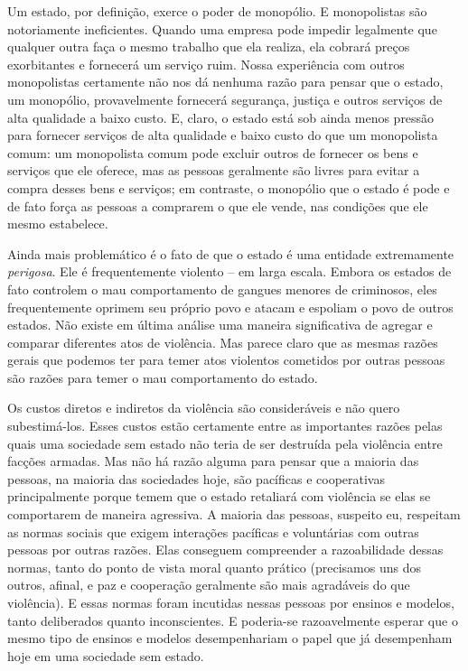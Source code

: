 Um estado, por definição, exerce o poder de monopólio. E monopolistas são notoriamente ineficientes. Quando uma empresa pode impedir legalmente que qualquer outra faça o mesmo trabalho que ela realiza, ela cobrará preços exorbitantes e fornecerá um serviço ruim. Nossa experiência com outros monopolistas certamente não nos dá nenhuma razão para pensar que o estado, um monopólio, provavelmente fornecerá segurança, justiça e outros serviços de alta qualidade a baixo custo. E, claro, o estado está sob ainda menos pressão para fornecer serviços de alta qualidade e baixo custo do que um monopolista comum: um monopolista comum pode excluir outros de fornecer os bens e serviços que ele oferece, mas as pessoas geralmente são livres para evitar a compra desses bens e serviços; em contraste, o monopólio que o estado é pode e de fato força as pessoas a comprarem o que ele vende, nas condições que ele mesmo estabelece.

Ainda mais problemático é o fato de que o estado é uma entidade extremamente \emph{perigosa}. Ele é frequentemente violento -- em larga escala. Embora os estados de fato controlem o mau comportamento de gangues menores de criminosos, eles frequentemente oprimem seu próprio povo e atacam e espoliam o povo de outros estados. Não existe em última análise uma maneira significativa de agregar e comparar diferentes atos de violência. Mas parece claro que as mesmas razões gerais que podemos ter para temer atos violentos cometidos por outras pessoas são razões para temer o mau comportamento do estado.

Os custos diretos e indiretos da violência são consideráveis e não quero subestimá-los. Esses custos estão certamente entre as importantes razões pelas quais uma sociedade sem estado não teria de ser destruída pela violência entre facções armadas. Mas não há razão alguma para pensar que a maioria das pessoas, na maioria das sociedades hoje, são pacíficas e cooperativas principalmente porque temem que o estado retaliará com violência se elas se comportarem de maneira agressiva. A maioria das pessoas, suspeito eu, respeitam as normas sociais que exigem interações pacíficas e voluntárias com outras pessoas por outras razões. Elas conseguem compreender a razoabilidade dessas normas, tanto do ponto de vista moral quanto prático (precisamos uns dos outros, afinal, e paz e cooperação geralmente são mais agradáveis do que violência). E essas normas foram incutidas nessas pessoas por ensinos e modelos, tanto deliberados quanto inconscientes. E poderia-se razoavelmente esperar que o mesmo tipo de ensinos e modelos desempenhariam o papel que já desempenham hoje em uma sociedade sem estado.

